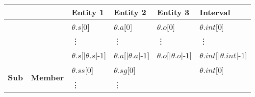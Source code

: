 \documentclass[11pt]{report}
\begin{document}
        \begin{table}[tbhp]
          \begin{center}
            \begin{tabular}[t]{|l|l|l|l|l|l|}
              \hline
              \multicolumn{2}{|l|}{\textbf{}} &
              \textbf{Entity 1} &
              \textbf{Entity 2} &
              \textbf{Entity 3} &
              \textbf{Interval} \\
              \hline
              \multicolumn{2}{|c|}{
                \multirow{3}{*}{
                  \begin{sideways}
                    \textbf{Holds}
                  \end{sideways}
                }
              } &
              $\theta$.$s$[$0$] &
              $\theta$.$a$[$0$] &
              $\theta$.$o$[$0$] &
              $\theta$.$int$[$0$] \\
              \multicolumn{2}{|c|}{} &
              \hspace{1em}\vdots &
              \hspace{1em}\vdots &
              \hspace{1em}\vdots &
              \hspace{1em}\vdots \\
              \multicolumn{2}{|c|}{} &
              $\theta$.$s$[$|\theta$.$s|$-$1$] &
              $\theta$.$a$[$|\theta$.$a|$-$1$] &
              $\theta$.$o$[$|\theta$.$o|$-$1$] &
              $\theta$.$int$[$|\theta$.$int|$-$1$] \\
              \hline
              \multirow{3}{*}{
                \begin{sideways}
                  \textbf{Sub}
                \end{sideways}
              } &
              \multirow{9}{*}{
                \begin{sideways}
                  \textbf{Member}
                \end{sideways}
              } &
              $\theta$.$ss$[$0$] &
              $\theta$.$sg$[$0$] &
              &
              $\theta$.$int$[$0$] \\
              &
              &
              \hspace{1em}\vdots &
              \hspace{1em}\vdots &

\end{tabular}
\end{center}
\end{table}
\end{document}
